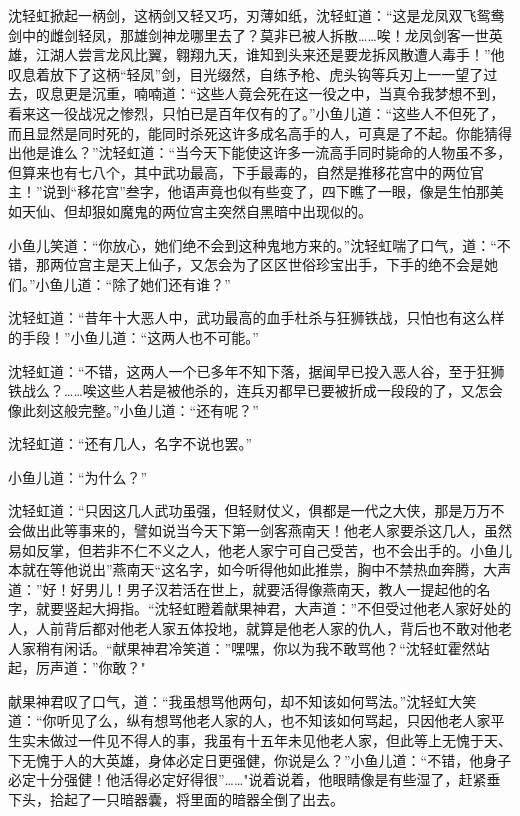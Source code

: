 \documentclass[12pt,oneside]{book}
\begin{document}
沈轻虹掀起一柄剑，这柄剑又轻又巧，刃薄如纸，沈轻虹道：``这是龙凤双飞鸳鸯剑中的雌剑轻凤，那雄剑神龙哪里去了？莫非已被人拆散\ldots\ldots 唉！龙凤剑客一世英雄，江湖人尝言龙风比翼，翱翔九天，谁知到头来还是要龙拆风散遭人毒手！''他叹息着放下了这柄``轻凤''剑，目光缀然，自练予枪、虎头钩等兵刃上一一望了过去，叹息更是沉重，喃喃道：``这些人竟会死在这一役之中，当真令我梦想不到，看来这一役战况之惨烈，只怕已是百年仅有的了。''小鱼儿道：``这些人不但死了，而且显然是同时死的，能同时杀死这许多成名高手的人，可真是了不起。你能猜得出他是谁么？''沈轻虹道：``当今天下能使这许多一流高手同时毙命的人物虽不多，但算来也有七八个，其中武功最高，下手最毒的，自然是推移花宫中的两位官主！''说到``移花宫''叁字，他语声竟也似有些变了，四下瞧了一眼，像是生怕那美如天仙、但却狠如魔鬼的两位宫主突然自黑暗中出现似的。

小鱼儿笑道：``你放心，她们绝不会到这种鬼地方来的。''沈轻虹喘了口气，道：``不错，那两位宫主是天上仙子，又怎会为了区区世俗珍宝出手，下手的绝不会是她们。''小鱼儿道：``除了她们还有谁？''

沈轻虹道：``昔年十大恶人中，武功最高的血手杜杀与狂狮铁战，只怕也有这么样的手段！''小鱼儿道：``这两人也不可能。''

沈轻虹道：``不错，这两人一个已多年不知下落，据闻早已投入恶人谷，至于狂狮铁战么？\ldots\ldots 唉这些人若是被他杀的，连兵刃都早已要被折成一段段的了，又怎会像此刻这般完整。''小鱼儿道：``还有呢？''

沈轻虹道：``还有几人，名字不说也罢。''

小鱼儿道：``为什么？''

沈轻虹道：``只因这几人武功虽强，但轻财仗义，俱都是一代之大侠，那是万万不会做出此等事来的，譬如说当今天下第一剑客燕南天！他老人家要杀这几人，虽然易如反掌，但若非不仁不义之人，他老人家宁可自己受苦，也不会出手的。小鱼儿本就在等他说出''燕南天``这名字，如今听得他如此推祟，胸中不禁热血奔腾，大声道：''好！好男儿！男子汉若活在世上，就要活得像燕南天，教人一提起他的名字，就要竖起大拇指。``沈轻虹瞪着献果神君，大声道：''不但受过他老人家好处的人，人前背后都对他老人家五体投地，就算是他老人家的仇人，背后也不敢对他老人家稍有闲话。``献果神君冷笑道：''嘿嘿，你以为我不敢骂他？``沈轻虹霍然站起，厉声道：''你敢？"

献果神君叹了口气，道：``我虽想骂他两句，却不知该如何骂法。''沈轻虹大笑道：``你听见了么，纵有想骂他老人家的人，也不知该如何骂起，只因他老人家平生实未做过一件见不得人的事，我虽有十五年未见他老人家，但此等上无愧于天、下无愧于人的大英雄，身体必定日更强健，你说是么？''小鱼儿道：``不错，他身子必定十分强健！他活得必定好得很''\ldots\ldots"说着说着，他眼睛像是有些湿了，赶紧垂下头，拾起了一只暗器囊，将里面的暗器全倒了出去。
\end{document}
